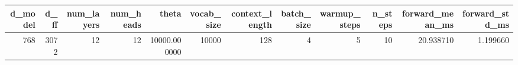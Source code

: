 \begin{tabular}{rrrrrrrrrrrr}
\toprule
d_model & d_ff & num_layers & num_heads & theta & vocab_size & context_length & batch_size & warmup_steps & n_steps & forward_mean_ms & forward_std_ms \\
\midrule
768 & 3072 & 12 & 12 & 10000.000000 & 10000 & 128 & 4 & 5 & 10 & 20.938710 & 1.199660 \\
\bottomrule
\end{tabular}
